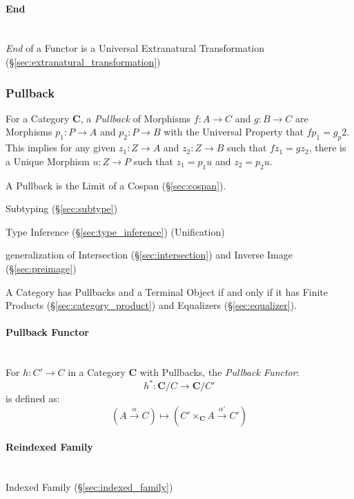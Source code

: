 \paragraph{End}\label{sec:end}
\hfill \\

\emph{End} of a Functor is a Universal Extranatural Transformation
(\S\ref{sec:extranatural_transformation})



\subsubsection{Pullback}\label{sec:pullback}

For a Category $\mathbf{C}$, a \emph{Pullback} of Morphisms $f : A
\rightarrow C$ and $g : B \rightarrow C$ are Morphisms $p_1 : P
\rightarrow A$ and $p_2 : P \rightarrow B$ with the Universal Property
that $fp_1 = g_p2$. This implies for any given $z_1 : Z \rightarrow A$
and $z_2 : Z \rightarrow B$ such that $fz_1 = gz_2$, there is a Unique
Morphism $u : Z \rightarrow P$ such that $z_1 = p_1 u$ and $z_2 = p_2
u$.

A Pullback is the Limit of a Cospan (\S\ref{sec:cospan}).

Subtyping (\S\ref{sec:subtype})

Type Inference (\S\ref{sec:type_inference}) (Unification)

generalization of Intersection (\S\ref{sec:intersection}) and Inverse
Image (\S\ref{sec:preimage})

A Category has Pullbacks and a Terminal Object if and only if it has
Finite Products (\S\ref{sec:category_product}) and Equalizers
(\S\ref{sec:equalizer}). \cite{awodey06}



\paragraph{Pullback Functor}\label{sec:pullback_functor}\cite{awodey06}
\hfill \\

For $h : C' \rightarrow C$ in a Category $\mathbf{C}$ with Pullbacks,
the \emph{Pullback Functor}:
\[
  h^* : \mathbf{C}/C \rightarrow \mathbf{C}/C'
\]
is defined as:
\[
  (A \xrightarrow{\alpha} C) \mapsto
    (C' \times_\mathbf{C} A \xrightarrow{\alpha '} C')
\]



\paragraph{Reindexed Family}\label{sec:reindexed_family}
\hfill \\
Indexed Family (\S\ref{sec:indexed_family})



